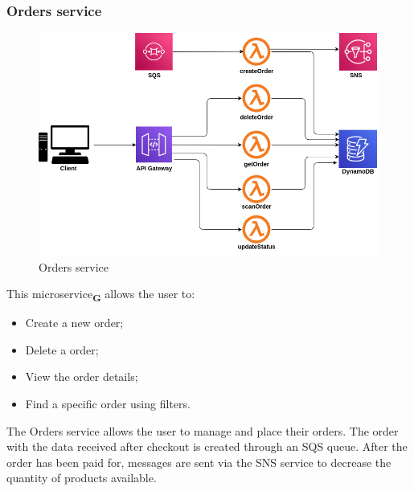 \subsubsection{Orders service}
\begin{figure}[!h]
    \vspace{5px}
    \includegraphics[scale=0.5]{../../../../Images/Diagrammi/maintainerManual/orderService.png}
    \centering
    \caption{Orders service}
\end{figure}
This microservice\textsubscript{\textbf{G}} allows the user to:
\begin{itemize}
    \item Create a new order;
    \item Delete a order;
    \item View the order details;
    \item Find a specific order using filters.
\end{itemize}
The Orders service allows the user to manage and place their orders.
The order with the data received after checkout is created through an SQS queue. After the order has been paid for, messages are sent via the SNS service to decrease the quantity of products available.
\pagebreak
